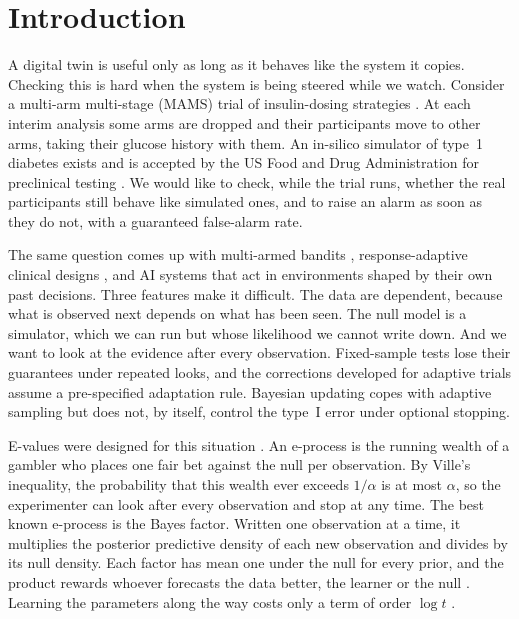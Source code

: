 
\section{Introduction}\label{sec:intro}

A digital twin is useful only as long as it behaves like the system it
copies. Checking this is hard when the system is being steered while we
watch. Consider a multi-arm multi-stage (MAMS) trial of insulin-dosing
strategies \citep{whitehead1997design,magirr2012generalized}. At each interim
analysis some arms are dropped and their participants move to other arms,
taking their glucose history with them. An in-silico simulator of type~1
diabetes exists and is accepted by the US Food and Drug Administration for
preclinical testing \citep{kovatchev2009insilico}. We would like to check,
while the trial runs, whether the real participants still behave like
simulated ones, and to raise an alarm as soon as they do not, with a
guaranteed false-alarm rate.

The same question comes up with multi-armed bandits
\citep{lattimore2020bandit}, response-adaptive clinical designs
\citep{trippa2012bayesian,villar2015multi}, and AI systems that act in
environments shaped by their own past decisions. Three features make it
difficult. The data are dependent, because what is observed next depends on
what has been seen. The null model is a simulator, which we can run but whose
likelihood we cannot write down. And we want to look at the evidence after
every observation. Fixed-sample tests lose their guarantees under repeated
looks, and the corrections developed for adaptive trials
\citep{bowden2017unbiased,magirr2012generalized} assume a pre-specified
adaptation rule. Bayesian updating copes with adaptive sampling but does not,
by itself, control the type~I error under optional stopping.

E-values were designed for this situation
\citep{vovk2021evalues,ramdas2023game,grunwald2024safe}. An e-process is the
running wealth of a gambler who places one fair bet against the null per
observation. By Ville's inequality, the probability that this wealth ever
exceeds $1/\alpha$ is at most $\alpha$, so the experimenter can look after
every observation and stop at any time. The best known e-process is
the Bayes factor. Written one observation at a time, it multiplies the
posterior predictive density of each new observation and divides by its null
density. Each factor has mean one under the null for every prior, and the
product rewards whoever forecasts the data better, the learner or the null
\citep{dawid1984present}. Learning the parameters along the way costs only a
term of order $\log t$ \citep{clarke1990information}.

